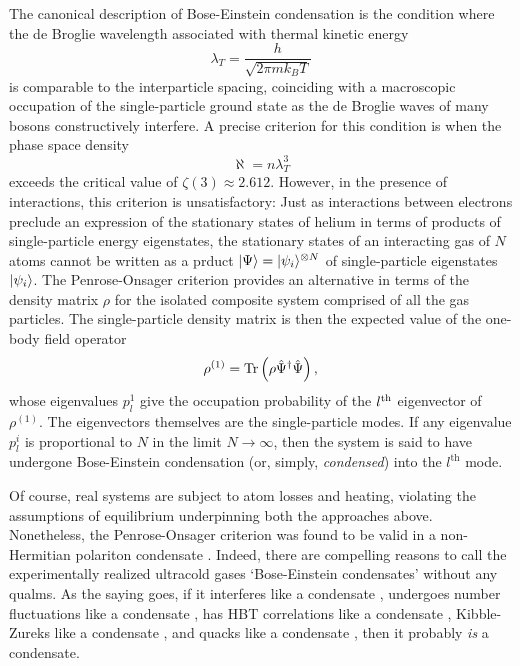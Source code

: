 	The canonical description of Bose-Einstein condensation is the condition where the de Broglie wavelength associated with thermal kinetic energy
	\begin{equation}
		\lambda_T = \frac{h}{\sqrt{2\pi m k_B T}}
	\end{equation}
	is comparable to the interparticle spacing, coinciding with a macroscopic occupation of the single-particle ground state as the de Broglie waves of many bosons constructively interfere. A precise criterion for this condition is when the phase space density
	\begin{equation}
		\aleph = n \lambda_T^3
	\end{equation}
	exceeds the critical value of $\zeta(3)\approx2.612$. However, in the presence of interactions, this criterion is unsatisfactory: Just as interactions between electrons preclude an expression of the stationary states of helium in terms of products of single-particle energy eigenstates, the stationary states of an interacting gas of $N$ atoms cannot be written as a prduct $|\Psi\rangle = |\psi_i\rangle^{\otimes N}$ of single-particle eigenstates $|\psi_i\rangle$. The Penrose-Onsager criterion \cite{penrose56} provides an alternative in terms of the density matrix $\rho$ for the isolated composite system comprised of all the gas particles. The single-particle density matrix is then the expected value of the one-body field operator
	\begin{equation}
		\rho^{(1)} = \textrm{Tr}\left(\rho\hat{\Psi}^\dagger\hat{\Psi}\right),
	\end{equation}
	whose eigenvalues $p_{l}^{1}$ give the occupation probability of the $l^{\rm th}$ eigenvector of $\rho^{(1)}$. The eigenvectors themselves are the single-particle modes. If any eigenvalue $p_{l}^{i}$ is proportional to $N$ in the limit $N\rightarrow\infty$, then the system is said to have undergone Bose-Einstein condensation (or, simply, \emph{condensed}) into the $l^\textrm{th}$ mode. 

	Of course, real systems are subject to atom losses and heating, violating the assumptions of equilibrium underpinning both the approaches above. Nonetheless, the Penrose-Onsager criterion was found to be valid in a non-Hermitian polariton condensate \cite{manni12}. Indeed, there are compelling reasons to call the experimentally realized ultracold gases `Bose-Einstein condensates' without any qualms. As the saying goes, if it interferes like a condensate \cite{andrews97} , undergoes number fluctuations like a condensate \cite{kristensen19},  has HBT correlations like a condensate \cite{schellekens05,jeltes07}, Kibble-Zureks like a condensate \cite{anquez16}, and quacks like a condensate \cite{duck01}, then it probably \emph{is} a condensate. 

